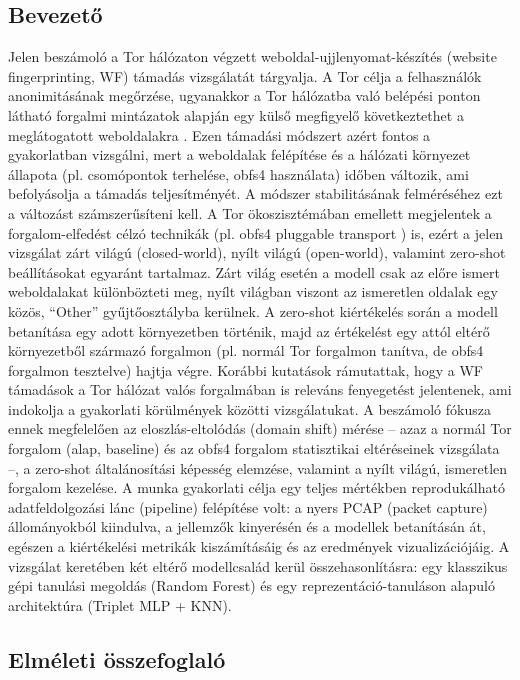 \documentclass[a4paper,oneside]{article}
\begin{document}
\subsection{Bevezető}
\label{sec:bevezeto}

Jelen beszámoló a Tor hálózaton végzett weboldal-ujjlenyomat-készítés (website fingerprinting, WF) támadás vizsgálatát tárgyalja.
A Tor célja a felhasználók anonimitásának megőrzése, ugyanakkor a Tor hálózatba való belépési ponton látható forgalmi mintázatok alapján egy külső megfigyelő következtethet a meglátogatott weboldalakra \cite{dingledine2004}.
Ezen támadási módszert azért fontos a gyakorlatban vizsgálni, mert a weboldalak felépítése és a hálózati környezet állapota (pl. csomópontok terhelése, obfs4 használata) időben változik, ami befolyásolja a támadás teljesítményét.
A módszer stabilitásának felméréséhez ezt a változást számszerűsíteni kell. A Tor ökoszisztémában emellett megjelentek a forgalom-elfedést célzó technikák (pl. obfs4 pluggable transport \cite{wiley2013obfs4}) is, ezért a jelen vizsgálat zárt világú (closed-world), nyílt világú (open-world), valamint zero-shot beállításokat egyaránt tartalmaz.
Zárt világ esetén a modell csak az előre ismert weboldalakat különbözteti meg, nyílt világban viszont az ismeretlen oldalak egy közös, ``Other'' gyűjtőosztályba kerülnek.
A zero-shot kiértékelés során a modell betanítása egy adott környezetben történik, majd az értékelést egy attól eltérő környezetből származó forgalmon (pl. normál Tor forgalmon tanítva, de obfs4 forgalmon tesztelve) hajtja végre.
Korábbi kutatások \cite{cherubin2022} rámutattak, hogy a WF támadások a Tor hálózat valós forgalmában is releváns fenyegetést jelentenek, ami indokolja a gyakorlati körülmények közötti vizsgálatukat.
A beszámoló fókusza ennek megfelelően az eloszlás-eltolódás (domain shift) mérése – azaz a normál Tor forgalom (alap, baseline) és az obfs4 forgalom statisztikai eltéréseinek vizsgálata –, a zero-shot általánosítási képesség elemzése, valamint a nyílt világú, ismeretlen forgalom kezelése.
A munka gyakorlati célja egy teljes mértékben reprodukálható adatfeldolgozási lánc (pipeline) felépítése volt: a nyers PCAP (packet capture) állományokból kiindulva, a jellemzők kinyerésén és a modellek betanításán át, egészen a kiértékelési metrikák kiszámításáig és az eredmények vizualizációjáig.
A vizsgálat keretében két eltérő modellcsalád kerül összehasonlításra: egy klasszikus gépi tanulási megoldás (Random Forest) és egy reprezentáció-tanuláson alapuló architektúra (Triplet MLP + KNN).
\subsection{Elméleti összefoglaló}
\end{document}
